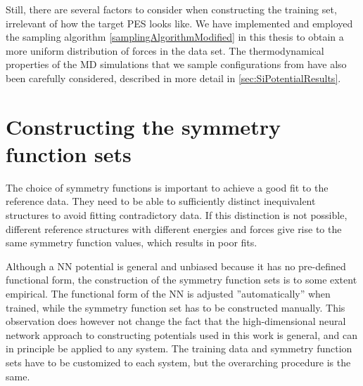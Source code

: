 \documentclass[twoside,english]{uiofysmaster}
\begin{document}
Still, there are several factors to consider when constructing the training set, irrelevant of how the target PES looks like.  
We have implemented and employed the sampling algorithm \eqref{samplingAlgorithmModified} in this thesis to obtain a more uniform
distribution of forces in the data set. The thermodynamical properties of the MD simulations that we sample configurations 
from have also been carefully considered, described in more detail in \autoref{sec:SiPotentialResults}.  





\section{Constructing the symmetry function sets}
The choice of symmetry functions is important to achieve a good fit to the reference data. 
They need to be able to sufficiently distinct inequivalent structures to avoid fitting 
contradictory data. If this distinction is not possible, different reference structures with 
different energies and forces give rise to the same symmetry function values, which results in poor fits. 

Although a NN potential is general and unbiased because it has no pre-defined functional form, the 
construction of the symmetry function sets is to some extent empirical. The functional form of the NN
is adjusted ''automatically'' when trained, while the symmetry function set has to be constructed manually.
This observation does however not change the fact that the high-dimensional neural network approach to
constructing potentials used in this work is general, and can in principle be applied to any system. The training data
and symmetry function sets have to be customized to each system, but the overarching procedure is the same. 
\end{document}

